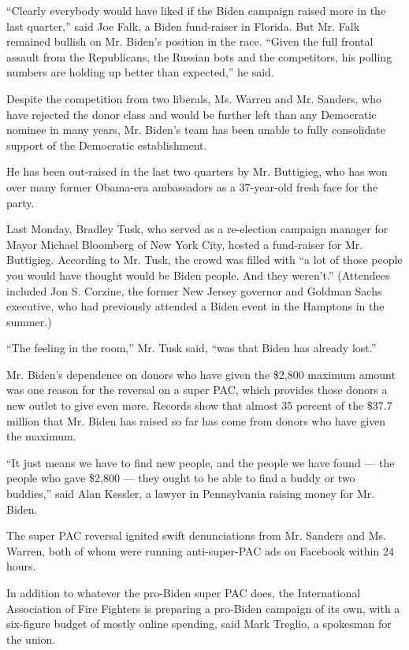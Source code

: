 ``Clearly everybody would have liked if the Biden campaign raised more
in the last quarter,'' said Joe Falk, a Biden fund-raiser in Florida.
But Mr. Falk remained bullish on Mr. Biden's position in the race.
``Given the full frontal assault from the Republicans, the Russian bots
and the competitors, his polling numbers are holding up better than
expected,'' he said.

Despite the competition from two liberals, Ms. Warren and Mr. Sanders,
who have rejected the donor class and would be further left than any
Democratic nominee in many years, Mr. Biden's team has been unable to
fully consolidate support of the Democratic establishment.

He has been out-raised in the last two quarters by Mr. Buttigieg, who
has won over many former Obama-era ambassadors as a 37-year-old fresh
face for the party.

Last Monday, Bradley Tusk, who served as a re-election campaign manager
for Mayor Michael Bloomberg of New York City, hosted a fund-raiser for
Mr. Buttigieg. According to Mr. Tusk, the crowd was filled with ``a lot
of those people you would have thought would be Biden people. And they
weren't.'' (Attendees included Jon S. Corzine, the former New Jersey
governor and Goldman Sachs executive, who had previously attended a
Biden event in the Hamptons in the summer.)

``The feeling in the room,'' Mr. Tusk said, ``was that Biden has already
lost.''

Mr. Biden's dependence on donors who have given the \$2,800 maximum
amount was one reason for the reversal on a super PAC, which provides
those donors a new outlet to give even more. Records show that almost 35
percent of the \$37.7 million that Mr. Biden has raised so far has come
from donors who have given the maximum.

``It just means we have to find new people, and the people we have found
--- the people who gave \$2,800 --- they ought to be able to find a
buddy or two buddies,'' said Alan Kessler, a lawyer in Pennsylvania
raising money for Mr. Biden.

The super PAC reversal ignited swift denunciations from Mr. Sanders and
Ms. Warren, both of whom were running anti-super-PAC ads on Facebook
within 24 hours.

In addition to whatever the pro-Biden super PAC does, the International
Association of Fire Fighters is preparing a pro-Biden campaign of its
own, with a six-figure budget of mostly online spending, said Mark
Treglio, a spokesman for the union.

